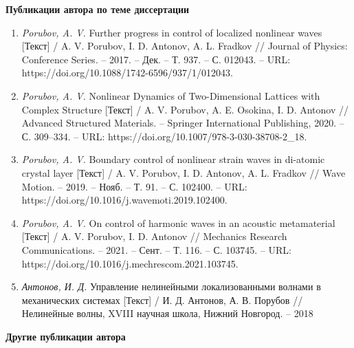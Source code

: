 \vspace{5pt}

\begin{center}\textbf{Публикации автора по теме диссертации}\end{center}

\begin{enumerate}
\item \textit{Porubov, A. V.} Further progress in control of localized nonlinear waves [Текст] / A. V. Porubov, I. D. Antonov, A. L. Fradkov // Journal of Physics: Conference Series. -- 2017. -- Дек. -- Т. 937. -- С. 012043. -- URL: https://doi.org/10.1088/1742-6596/937/1/012043.	
	
\item \textit{Porubov, A. V.} Nonlinear Dynamics of Two-Dimensional Lattices with Complex Structure [Текст] / A. V. Porubov, A. E. Osokina, I. D. Antonov // Advanced Structured Materials. -- Springer International Publishing, 2020. -- С. 309--334. -- URL: https://doi.org/10.1007/978-3-030-38708-2\_18.

\item \textit{Porubov, A. V.} Boundary control of nonlinear strain waves in di-atomic crystal layer [Текст] / A. V. Porubov, I. D. Antonov, A. L. Fradkov // Wave Motion. -- 2019. -- Нояб. -- Т. 91. -- С. 102400. -- URL: https://doi.org/10.1016/j.wavemoti.2019.102400.

\item \textit{Porubov, A. V.} On control of harmonic waves in an acoustic metamaterial [Текст] / A. V. Porubov, I. D. Antonov // Mechanics Research Communications. -- 2021. -- Сент. -- Т. 116. -- С. 103745. -- URL: https://doi.org/10.1016/j.mechrescom.2021.103745.

\item \textit{Антонов, И. Д.} Управление нелинейными локализованными волнами в механических системах [Текст] / И. Д. Антонов, А. В. Порубов // Нелинейные волны, XVIII научная школа, Нижний Новгород. -- 2018
\end{enumerate}

\vspace{5pt}

\begin{center}\textbf{Другие публикации автора}\end{center}

